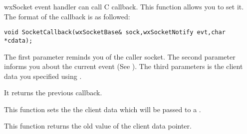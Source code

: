 

\label{wxsocketbasecallback}


wxSocket event handler can call C callback. This function allows you to set it.
The format of the callback is as followed:
\begin{verbatim}
void SocketCallback(wxSocketBase& sock,wxSocketNotify evt,char *cdata);
\end{verbatim}

The first parameter reminds you of the caller socket. The second parameter
informs you about the current event (See ).
The third parameters is the client data you specified using .


It returns the previous callback.



\label{wxsocketcallbackdata}


This function sets the the client data which will be passed to a .


This function returns the old value of the client data pointer.

\section{}\label{wxsocketclient}



